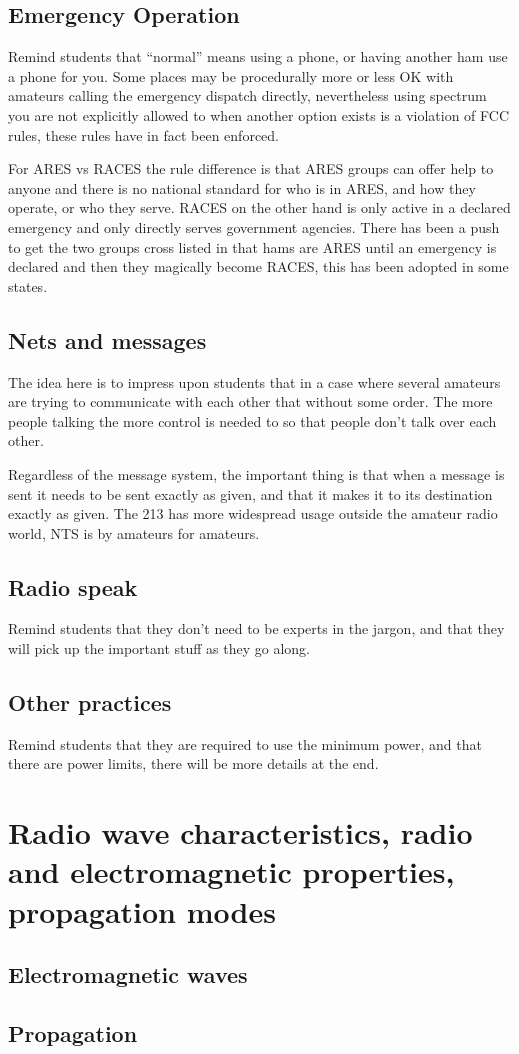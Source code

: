 \documentclass[12pt,letterpaper]{report}
\begin{document}
\subsection*{Emergency Operation}
Remind students that ``normal'' means using a phone, or having another ham use a phone for you. Some places may be procedurally more or less OK with amateurs calling the emergency dispatch directly, nevertheless using spectrum you are not explicitly allowed to when another option exists is a violation of FCC rules, these rules have in fact been enforced. 

For ARES vs RACES the rule difference is that ARES groups can offer help to anyone and there is no national standard for who is in ARES, and how they operate, or who they serve. RACES on the other hand is only active in a declared emergency and only directly serves government agencies. There has been a push to get the two groups cross listed in that hams are ARES until an emergency is declared and then they magically become RACES, this has been adopted in some states.

\subsection*{Nets and messages}
The idea here is to impress upon students that in a case where several amateurs are trying to communicate with each other that without some order. The more people talking the more control is needed to so that people don't talk over each other.

Regardless of the message system, the important thing is that when a message is sent it needs to be sent exactly as given, and that it makes it to its destination exactly as given. The 213 has more widespread usage outside the amateur radio world, NTS is by amateurs for amateurs. 

\subsection*{Radio speak}
Remind students that they don't need to be experts in the jargon, and that they will pick up the important stuff as they go along.

\subsection*{Other practices}
Remind students that they are required to use the minimum power, and that there are power limits, there will be more details at the end.

\section*{Radio wave characteristics, radio and electromagnetic properties, propagation modes}

\subsection*{Electromagnetic waves}


\subsection*{Propagation}
\end{document}
